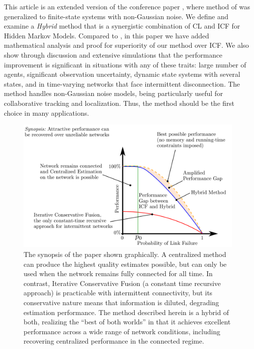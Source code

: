 \documentclass[journal]{IEEEtran}
\theoremstyle{remark}
\theoremstyle{definition}
\begin{document}
This article is an extended version of the conference paper
\cite{tamjidi2017efficient}, where method of \cite{tamjidi2016unifying} was
generalized to finite-state systems with non-Gaussian noise. We define
and examine a \emph{Hybrid} method that is a synergistic combination of CL and
ICF for Hidden Markov Models. 
Compared to \cite{tamjidi2017efficient}, in this paper we have added
mathematical analysis and proof for superiority of our method over ICF. We also
show through discussion and extensive simulations that the performance
improvement is significant in situations with any of these traits: large number
of agents, significant observation uncertainty, dynamic state systems with
several states, and in time-varying networks that face intermittent
disconnection.  The method handles non-Gaussian noise models, being
particularly useful for collaborative tracking and localization.  Thus, the
method should be the first choice in many applications. 

\begin{figure}[t]
\centering
\includegraphics[width=1.0\columnwidth]{./synopsis_for_journal_inkscape_text_black.pdf}
\caption{The synopsis of the paper shown graphically. A centralized method can produce
the highest quality estimates possible, but can only be used when the network
remains fully connected for all time. 
In contrast, Iterative Conservative Fusion (a constant time recursive
approach) is practicable with intermittent connectivity, but its 
conservative nature means that information is diluted, degrading estimation
performance. The method described herein is a hybrid of both, realizing the
``best of both worlds'' in that it achieves excellent performance across a wide range
of network conditions, including recovering centralized performance in the
connected regime.
\label{fig:synopsis} }
\end{figure} 
\end{document}
